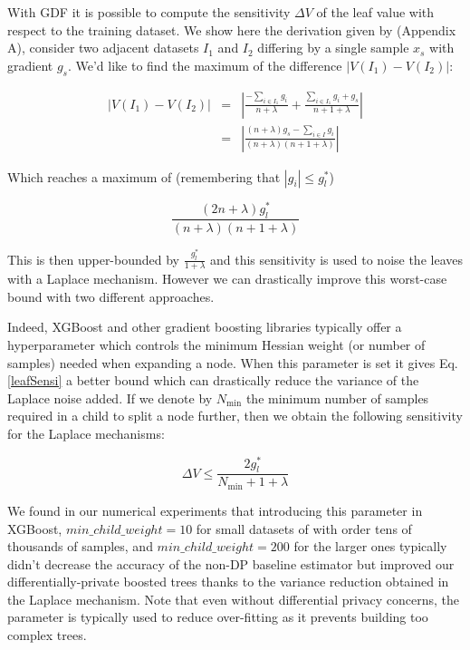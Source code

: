 \documentclass{article}
\theoremstyle{definition}
\begin{document}
With GDF it is possible to compute the sensitivity $\Delta V$ of the leaf value with respect to the training dataset. We show here the derivation given by \cite{li2020privacy} (Appendix A), consider two adjacent datasets $I_1$ and $I_2$ differing by a single sample $x_s$ with gradient $g_s$. We'd like to find the maximum of the difference $\vert V(I_1) - V(I_2) \vert$:

\begin{eqnarray*}
\vert V(I_1) - V(I_2) \vert &=& \left\vert \frac{-\sum_{i \in I_1} g_i }{n+\lambda} + \frac{\sum_{i \in I_1} g_i + g_s}{n+1+\lambda} \right\vert \\
 &=& \left\vert \frac{ (n+\lambda)g_s - \sum_{i \in I} g_i}{(n+\lambda)(n+1+\lambda)} \right\vert  
\end{eqnarray*} 

Which reaches a maximum of (remembering that $|g_i| \leq g_l^*$)  

\begin{equation}
\frac{(2n+\lambda)g_l^*}{(n+\lambda)(n+1+\lambda)} 
\label{leafSensi}
\end{equation} 

This is then upper-bounded by $\frac{g_l^*}{1+\lambda}$ and this sensitivity is used to noise the leaves with a Laplace mechanism. However we
can drastically improve this worst-case bound with two different approaches. 

Indeed, XGBoost and other gradient boosting libraries typically offer a hyperparameter which controls the minimum Hessian weight (or number of samples) needed when expanding a node. When this parameter is set it gives Eq. \ref{leafSensi} a better bound which can drastically reduce
the variance of the Laplace noise added. If we denote by $N_{\text{min}}$ the minimum number of samples required in a child to split a node further, then we obtain the following sensitivity for the Laplace mechanisms: 

\begin{equation}
\Delta V \leq \frac{2 g_l^*}{N_{\text{min}} + 1 + \lambda} 
\end{equation} 

We found in our numerical experiments that introducing this parameter in XGBoost,
$min\_child\_weight = 10$ for small datasets of with order tens of thousands of samples,
and $min\_child\_weight = 200$ for the larger ones typically didn't decrease the accuracy of the non-DP baseline estimator
but improved our differentially-private boosted trees thanks to the variance reduction obtained in the Laplace mechanism.
Note that even without differential privacy concerns, the parameter is typically
used to reduce over-fitting as it prevents building too complex trees.  
\end{document}
